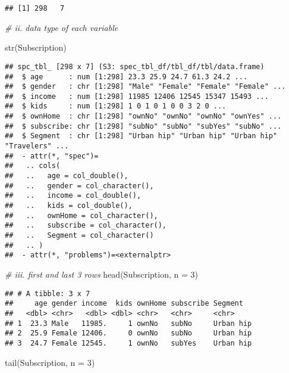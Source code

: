 \documentclass[
]{article}
\newenvironment{Shaded}{\begin{snugshade}}{\end{snugshade}}
\newcommand{\AttributeTok}[1]{\textcolor[rgb]{0.77,0.63,0.00}{#1}}
\newcommand{\CommentTok}[1]{\textcolor[rgb]{0.56,0.35,0.01}{\textit{#1}}}
\newcommand{\DecValTok}[1]{\textcolor[rgb]{0.00,0.00,0.81}{#1}}
\newcommand{\FunctionTok}[1]{\textcolor[rgb]{0.00,0.00,0.00}{#1}}
\newcommand{\NormalTok}[1]{#1}
\begin{document}
\begin{verbatim}
## [1] 298   7
\end{verbatim}

\begin{Shaded}
\begin{Highlighting}[]
\CommentTok{\# ii. data type of each variable}

\FunctionTok{str}\NormalTok{(Subscription)}
\end{Highlighting}
\end{Shaded}

\begin{verbatim}
## spc_tbl_ [298 x 7] (S3: spec_tbl_df/tbl_df/tbl/data.frame)
##  $ age      : num [1:298] 23.3 25.9 24.7 61.3 24.2 ...
##  $ gender   : chr [1:298] "Male" "Female" "Female" "Female" ...
##  $ income   : num [1:298] 11985 12406 12545 15347 15493 ...
##  $ kids     : num [1:298] 1 0 1 0 1 0 0 3 2 0 ...
##  $ ownHome  : chr [1:298] "ownNo" "ownNo" "ownNo" "ownYes" ...
##  $ subscribe: chr [1:298] "subNo" "subNo" "subYes" "subNo" ...
##  $ Segment  : chr [1:298] "Urban hip" "Urban hip" "Urban hip" "Travelers" ...
##  - attr(*, "spec")=
##   .. cols(
##   ..   age = col_double(),
##   ..   gender = col_character(),
##   ..   income = col_double(),
##   ..   kids = col_double(),
##   ..   ownHome = col_character(),
##   ..   subscribe = col_character(),
##   ..   Segment = col_character()
##   .. )
##  - attr(*, "problems")=<externalptr>
\end{verbatim}

\begin{Shaded}
\begin{Highlighting}[]
\CommentTok{\# iii. first and last 3 rows}
\FunctionTok{head}\NormalTok{(Subscription, }\AttributeTok{n =} \DecValTok{3}\NormalTok{)}
\end{Highlighting}
\end{Shaded}

\begin{verbatim}
## # A tibble: 3 x 7
##     age gender income  kids ownHome subscribe Segment  
##   <dbl> <chr>   <dbl> <dbl> <chr>   <chr>     <chr>    
## 1  23.3 Male   11985.     1 ownNo   subNo     Urban hip
## 2  25.9 Female 12406.     0 ownNo   subNo     Urban hip
## 3  24.7 Female 12545.     1 ownNo   subYes    Urban hip
\end{verbatim}

\begin{Shaded}
\begin{Highlighting}[]
\FunctionTok{tail}\NormalTok{(Subscription, }\AttributeTok{n =} \DecValTok{3}\NormalTok{)}
\end{Highlighting}
\end{Shaded}
\end{document}
